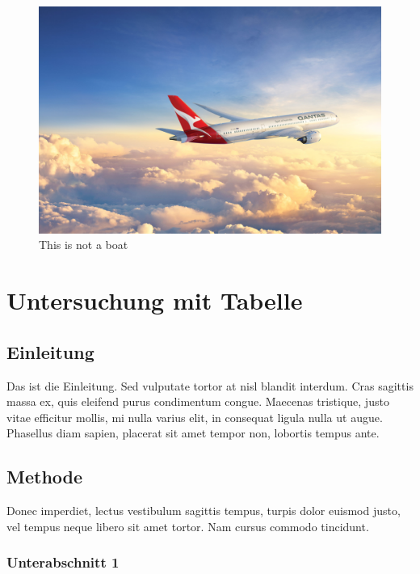 \documentclass[listof=totoc,index=totoc,bibliography=totoc,12pt,ngerman,a4paper,]{report}
\begin{document}
\begin{figure}
\hypertarget{fig:other_fig}{%
\centering
\includegraphics[width=1\textwidth,height=\textheight]{source/figures/full_caption_example.jpg}
\caption{This is not a boat}\label{fig:other_fig}
}
\end{figure}

\chapter{Untersuchung mit Tabelle}\label{sec:research-table}

\section{Einleitung}\label{einleitung-3}

Das ist die Einleitung. Sed vulputate tortor at nisl blandit interdum.
Cras sagittis massa ex, quis eleifend purus condimentum congue. Maecenas
tristique, justo vitae efficitur mollis, mi nulla varius elit, in
consequat ligula nulla ut augue. Phasellus diam sapien, placerat sit
amet tempor non, lobortis tempus ante.

\section{Methode}\label{methode-2}

Donec imperdiet, lectus vestibulum sagittis tempus, turpis dolor euismod
justo, vel tempus neque libero sit amet tortor. Nam cursus commodo
tincidunt.

\subsection{Unterabschnitt 1}\label{unterabschnitt-1-1}
\end{document}
